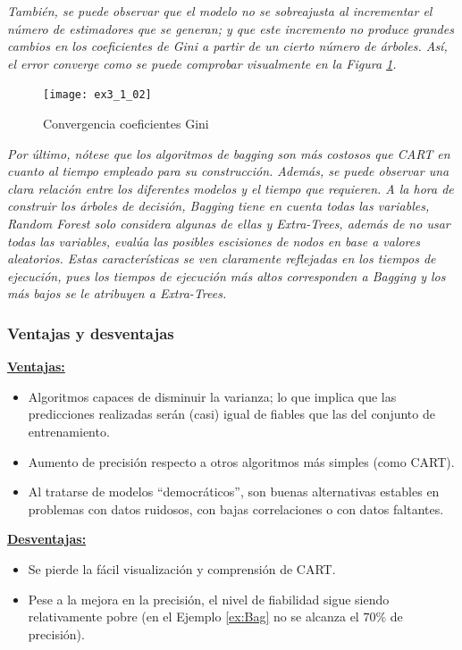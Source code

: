 \documentclass[12pt,twoside]{article}
\begin{document}
\emph{También, se puede observar que el modelo no se sobreajusta al incrementar el número de estimadores que se generan; y que este incremento no produce grandes cambios en los coeficientes de Gini a partir de un cierto número de árboles. Así, el error converge como se puede comprobar visualmente en la Figura \ref{fig:exbagging}.}

\begin{figure}[h]
\centering
\texttt{[image: ex3\_1\_02]}
\caption{Convergencia coeficientes Gini}
\label{fig:exbagging}
\end{figure}

\emph{Por último, nótese que los algoritmos de bagging son más costosos que CART en cuanto al tiempo empleado para su construcción. Además, se puede observar una clara relación entre los diferentes modelos y el tiempo que requieren. A la hora de construir los árboles de decisión, Bagging tiene en cuenta todas las variables, Random Forest solo considera algunas de ellas y Extra-Trees, además de no usar todas las variables, evalúa las posibles escisiones de nodos en base a valores aleatorios. Estas características se ven claramente reflejadas en los tiempos de ejecución, pues los tiempos de ejecución más altos corresponden a Bagging y los más bajos se le atribuyen a Extra-Trees.}


\subsubsection{Ventajas y desventajas}
\textbf{\underline{Ventajas:}}
\begin{itemize}
\item  Algoritmos capaces de disminuir la varianza; lo que implica que las predicciones realizadas serán (casi) igual de fiables que las del conjunto de entrenamiento.
\item Aumento de precisión respecto a otros algoritmos más simples (como CART).
\item Al tratarse de modelos ``democráticos'', son buenas alternativas estables en problemas con datos ruidosos, con bajas correlaciones o con datos faltantes.
\end{itemize}

\textbf{\underline{Desventajas:}}
\begin{itemize}
\item Se pierde la fácil visualización y comprensión de CART.
\item Pese a la mejora en la precisión, el nivel de fiabilidad sigue siendo relativamente pobre (en el Ejemplo \ref{ex:Bag} no se alcanza el $70 \%$ de precisión).
\end{itemize}
\end{document}
